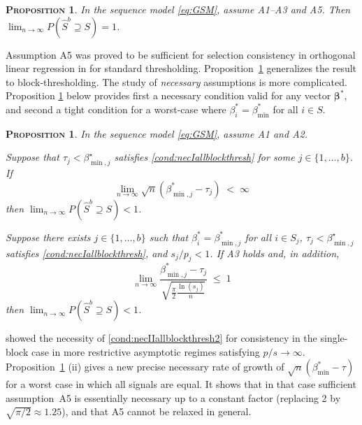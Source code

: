 \documentclass[aos]{imsart}
\theoremstyle{plain}
\newtheorem{prop}[thm]{\textsc{Proposition}}
\newcommand{\bs}{\boldsymbol}
\begin{document}
\begin{prop}\label{prop:suffnecIIblockthresh}
 In the sequence model \eqref{eq:GSM}, assume A1--A3 and A5. Then
$\lim_{n \rightarrow \infty} P(\hat{S}^{b}\supseteq  S)= 1$.
\end{prop}
Assumption A5 was proved to be sufficient for selection consistency in orthogonal linear regression in \cite{wainwrighthighdimbook} for standard thresholding. Proposition~\ref{prop:suffnecIIblockthresh} generalizes the result to block-thresholding. The study of {\it necessary} assumptions
is more complicated. Proposition \ref{prop:necIIblockthresh} below provides first a necessary condition valid for any vector $\bs \beta^*$, and second a tight condition for a worst-case where $\beta_i^*=\beta_{\min}^*$ for all $i\in S$.
\begin{prop}\label{prop:necIIblockthresh}In the
sequence model \eqref{eq:GSM}, assume A1 and A2.
\begin{longlist}
    \item Suppose that $\tau_j<\beta^\star_{\min,j}$ satisfies \eqref{cond:necIallblockthresh} for some $j \in \{1,\ldots,b\}$. If \begin{equation}\label{cond:necIIallblockthresh2}
    \lim_{n\to \infty} \sqrt{n}(\beta_{\min,j}^*-\tau_j)\; <\; \infty
\end{equation}
then $\lim_{n \rightarrow \infty} P(\hat S^{b}\supseteq S  ) < 1$.
\item Suppose there exists $j\in \{1,\ldots,b\}$ such that  $\beta^*_i=\beta_{\min,j}^*$ for all $i \in S_j$, $\tau_j<\beta^\star_{\min,j}$ satisfies \eqref{cond:necIallblockthresh}, and  $s_j/p_j<1$. If A3 holds and, in addition, 
\begin{equation}\label{cond:necIIallblockthresh}
\lim_{n\to \infty} 	\frac{\beta_{\min,j}^*-\tau_j}{\sqrt{\frac{\pi}{2}\frac{\ln(s_j)}{n}}} \;\leq\;  1\end{equation}
then $\lim_{n \rightarrow \infty} P(\hat S^{b}\supseteq S ) < 1$.
\end{longlist}\end{prop}
\cite{abraham2023sharp} showed the necessity of \eqref{cond:necIIallblockthresh2} for consistency in the single-block case
in more restrictive asymptotic regimes satisfying $p/s \to \infty$.
Proposition~\ref{prop:necIIblockthresh} (ii) gives a new precise necessary  rate of growth of $\sqrt{n}\left(\beta_{\min}^*-\tau\right)$ for a worst case in which all signals are equal. It shows that in that case sufficient assumption~A5 is essentially necessary up to a constant factor (replacing 2 by $\sqrt{\pi/2} \approx 1.25$), and that A5 cannot be relaxed in general.
\bigskip
\end{document}
